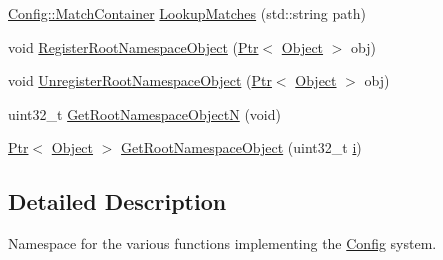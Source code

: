\begin{DoxyCompactItemize}
\item 
\hyperlink{classns3_1_1Config_1_1MatchContainer}{Config\+::\+Match\+Container} \hyperlink{group__config_ga74aeb63f8f50b4a98043351552ef7db6}{Lookup\+Matches} (std\+::string path)
\item 
void \hyperlink{group__config_gadf663c596f54bed678e83cccd4e3d9d5}{Register\+Root\+Namespace\+Object} (\hyperlink{classns3_1_1Ptr}{Ptr}$<$ \hyperlink{classns3_1_1Object}{Object} $>$ obj)
\item 
void \hyperlink{group__config_gac04cd4b31e97845ee008d101218e66b1}{Unregister\+Root\+Namespace\+Object} (\hyperlink{classns3_1_1Ptr}{Ptr}$<$ \hyperlink{classns3_1_1Object}{Object} $>$ obj)
\item 
uint32\+\_\+t \hyperlink{group__config_ga33e37a1c743294f67be8200b80de1c8b}{Get\+Root\+Namespace\+ObjectN} (void)
\item 
\hyperlink{classns3_1_1Ptr}{Ptr}$<$ \hyperlink{classns3_1_1Object}{Object} $>$ \hyperlink{group__config_gac7edffbe59256f872d7f1afe7612aeac}{Get\+Root\+Namespace\+Object} (uint32\+\_\+t \hyperlink{lte__uplink__power__control_8m_a6f6ccfcf58b31cb6412107d9d5281426}{i})
\end{DoxyCompactItemize}


\subsection{Detailed Description}
Namespace for the various functions implementing the \hyperlink{namespacens3_1_1Config}{Config} system. 